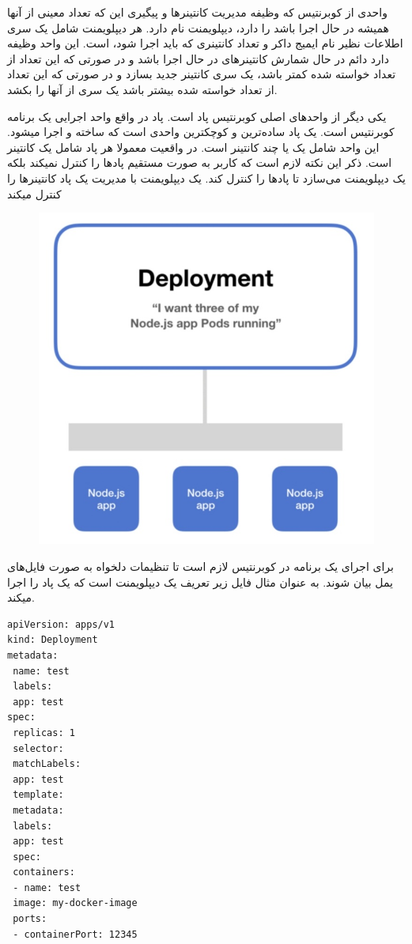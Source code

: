 \documentclass[a4]{report}
\begin{document}
واحدی از کوبرنتیس که وظیفه مدیریت کانتینر‌ها و پیگیری این که تعداد معینی از آنها همیشه در حال اجرا باشد را دارد، دیپلویمنت نام دارد. هر دیپلویمنت شامل یک سری اطلاعات نظیر نام ایمیج داکر و تعداد کانتینری که باید اجرا شود، است. این واحد وظیفه دارد دائم در حال شمارش کانتینر‌های در حال اجرا باشد و در صورتی که این تعداد از تعداد خواسته شده کمتر باشد، یک سری کانتینر جدید بسازد و در صورتی که این تعداد از تعداد خواسته شده بیشتر باشد یک سری از آنها را بکشد.

یکی دیگر از واحدهای اصلی کوبرنتیس پاد است. پاد در واقع واحد اجرایی یک برنامه کوبرنتیس است. یک
پاد ساده‌ترین و کوچکترین واحدی است که ساخته و اجرا میشود. این واحد شامل یک یا چند کانتینر است.
در واقعیت معمولا هر پاد شامل یک کانتینر است. ذکر این نکته لازم است که کاربر به صورت مستقیم پاد‌ها را
کنترل نمیکند بلکه یک دیپلویمنت می‌سازد تا پادها را کنترل کند. یک دیپلویمنت با مدیریت یک پاد
کانتینر‌ها را کنترل میکند

\begin{figure}
  \centering
  \includegraphics[scale=0.5]{fig/deployment}
\end{figure}

برای اجرای یک برنامه در کوبرنتیس لازم است تا تنظیمات دلخواه به صورت فایل‌های یمل
بیان شوند. به عنوان مثال فایل زیر تعریف یک دیپلویمنت است که یک پاد را اجرا میکند.

\begin{latin}
\begin{verbatim}
apiVersion: apps/v1
kind: Deployment
metadata:
 name: test
 labels:
 app: test
spec:
 replicas: 1
 selector:
 matchLabels:
 app: test
 template:
 metadata:
 labels:
 app: test
 spec:
 containers:
 - name: test
 image: my-docker-image
 ports:
 - containerPort: 12345
\end{verbatim}
\end{latin}
\end{document}
